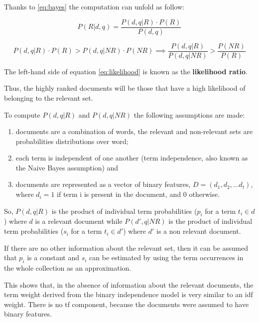 Thanks to \ref{eq:bayes} the computation can unfold as follow:

\begin{equation}
    \label{eq:bayes}
    \tag{Bayes rule}
    P(R| d, q) = \frac{P(d, q | R) \cdot P(R)}{P(d, q)}
\end{equation}

\begin{equation}
    \label{eq:likelihood}
    P(d, q | R) \cdot P(R) > P(d, q | NR) \cdot P(NR) \implies \frac{P(d, q| R)}{P(d, q | NR)} > \frac{P(NR)}{P(R)}
\end{equation}

The left-hand side of equation \ref{eq:likelihood} is known as the \textbf{likelihood ratio}.

Thus, the highly ranked documents will be those that have a high likelihood of belonging to the relevant set.

To compute $P(d, q | R)$ and $P(d, q | NR)$ the following assumptions are made:

\begin{enumerate}
    \item documents are a combination of words, the relevant and non-relevant sets are probabilities distributions over word;
    \item each term is independent of one another (term independence, also known as the Naive Bayes assumption) and
    \item documents are represented as a vector of binary features, $D = (d_1, d_2, \dots d_t)$, where $d_i = 1$ if term i is present in the document, and 0 otherwise.
\end{enumerate}

So, $P(d, q | R)$ is the product of individual term probabilities ($p_i$ for a term $t_i \in d$) where $d$ is a relevant document while $P(d', q | NR)$ is the product of individual term probabilities ($s_i$ for a term $t_i \in d'$) where $d'$ is a non relevant document.

If there are no other information about the relevant set, then it can be assumed that $p_i$ is a constant and $s_i$ can be estimated by using the term occurrences in the whole collection as an approximation.

This shows that, in the absence of information about
the relevant documents, the term weight derived from the binary independence
model is very similar to an idf weight. There is no tf component, because the
documents were assumed to have binary features.

